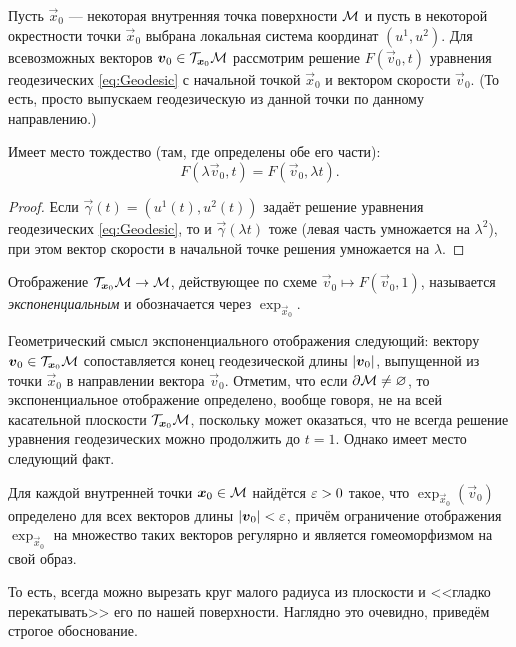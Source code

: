 Пусть $\vec{x}_0$ --- некоторая внутренняя точка поверхности $\mathcal{M}$ и пусть в некоторой окрестности точки $\vec{x}_0$ выбрана локальная система координат $(u^1, u^2)$. Для всевозможных векторов $\boldsymbol{v}_0 \in \mathcal{T}_{\boldsymbol{x}_0}\mathcal{M}$ рассмотрим решение $F(\vec{v}_0, t)$ уравнения геодезических \eqref{eq:Geodesic} с начальной точкой $\vec{x}_0$ и вектором скорости $\vec{v}_0$. (То есть, просто выпускаем геодезическую из данной точки по данному направлению.)

\begin{proposition}
	Имеет место тождество (там, где определены обе его части):
	\[
		F(\lambda\vec{v}_0, t) = F(\vec{v}_0, \lambda t).
	\]
\end{proposition}

\begin{proof}
	Если $\vec{\gamma}(t) = (u^1(t), u^2(t))$ задаёт решение уравнения геодезических \eqref{eq:Geodesic}, то и $\vec{\gamma}(\lambda t)$ тоже (левая часть умножается на $\lambda^2$), при этом вектор скорости в начальной точке решения умножается на $\lambda$.
\end{proof}

\begin{definition} \label{definition:GeodesicExp}
	Отображение $\mathcal{T}_{\boldsymbol{x}_0}\mathcal{M} \to \mathcal{M}$, действующее по схеме $\vec{v}_0 \mapsto F(\vec{v}_0, 1)$, называется \textit{экспоненциальным} и обозначается через $\exp_{\vec{x}_0}$.
\end{definition}

Геометрический смысл экспоненциального отображения следующий: вектору $\boldsymbol{v}_0 \in \mathcal{T}_{\boldsymbol{x}_0}\mathcal{M}$ сопоставляется конец геодезической длины $\left\lvert\boldsymbol{v}_0\right\rvert$, выпущенной из точки $\vec{x}_0$ в направлении вектора $\vec{v}_0$. Отметим, что если $\partial\mathcal{M} \ne \varnothing$, то экспоненциальное отображение определено, вообще говоря, не на всей касательной плоскости $\mathcal{T}_{\boldsymbol{x}_0}\mathcal{M}$, поскольку может оказаться, что не всегда решение уравнения геодезических можно продолжить до $t = 1$. Однако имеет место следующий факт.

\begin{theorem}
	Для каждой внутренней точки $\boldsymbol{x}_0 \in \mathcal{M}$ найдётся $\varepsilon > 0$ такое, что $\exp_{\vec{x}_0}(\vec{v}_0)$ определено для всех векторов длины $\left\lvert\boldsymbol{v}_0\right\rvert < \varepsilon$, причём ограничение отображения $\exp_{\vec{x}_0}$ на множество таких векторов регулярно и является гомеоморфизмом на свой образ.
\end{theorem}

То есть, всегда можно вырезать круг малого радиуса из плоскости и <<гладко перекатывать>> его по нашей поверхности. Наглядно это очевидно, приведём строгое обоснование.

